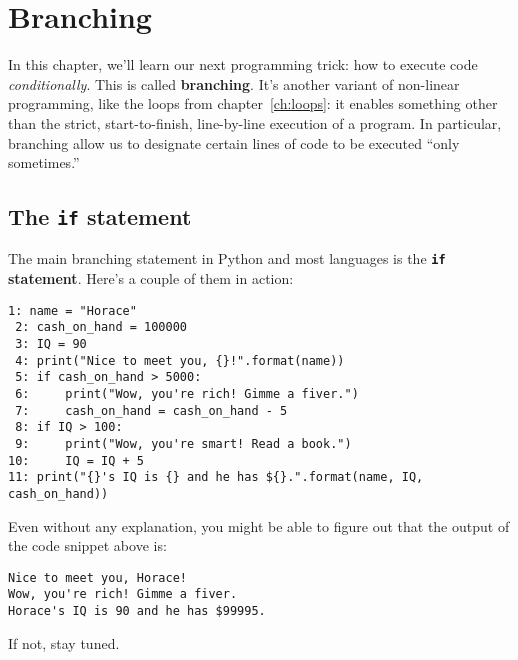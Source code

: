 
\chapter{Branching}
\label{ch:branching}


In this chapter, we'll learn our next programming trick: how to execute code
\textit{conditionally}. This is called \textbf{branching}. It's another variant
of non-linear programming, like the loops from chapter~\ref{ch:loops}: it
enables something other than the strict, start-to-finish, line-by-line
execution of a program. In particular, branching allow us to designate certain
lines of code to be executed ``only sometimes.''

\section{The \texttt{if} statement}


The main branching statement in Python and most languages is the
\textbf{\texttt{if} statement}. Here's a couple of them in action:


\begin{Verbatim}[fontsize=\small,samepage=true,frame=single,framesep=3mm]
 1: name = "Horace"
 2: cash_on_hand = 100000
 3: IQ = 90
 4: print("Nice to meet you, {}!".format(name))
 5: if cash_on_hand > 5000:
 6:     print("Wow, you're rich! Gimme a fiver.")
 7:     cash_on_hand = cash_on_hand - 5
 8: if IQ > 100:
 9:     print("Wow, you're smart! Read a book.")
10:     IQ = IQ + 5
11: print("{}'s IQ is {} and he has ${}.".format(name, IQ, cash_on_hand))
\end{Verbatim}
\vspace{-.2in}

Even without any explanation, you might be able to figure out that the output
of the code snippet above is:

\begin{Verbatim}[fontsize=\small,samepage=true,frame=leftline,framesep=5mm,framerule=1mm]
Nice to meet you, Horace!
Wow, you're rich! Gimme a fiver.
Horace's IQ is 90 and he has $99995.
\end{Verbatim}

If not, stay tuned.

\label{ifBody}

